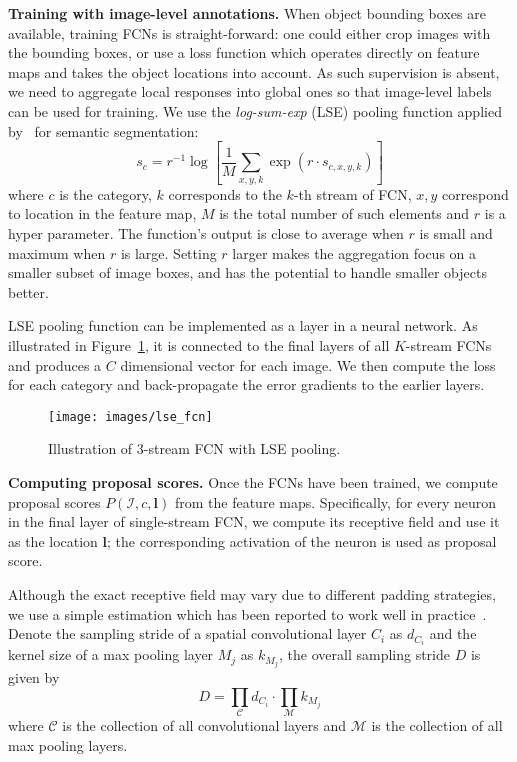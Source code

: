 \documentclass[10pt,twocolumn,letterpaper]{article}
\begin{document}
\textbf{Training with image-level annotations.} When object bounding boxes are available, training FCNs is straight-forward: one could either crop images with the bounding boxes, or use a loss function which operates directly on feature maps and takes the object locations into account. As such supervision is absent, we need to aggregate local responses into global ones so that image-level labels can be used for training. We use the \textit{log-sum-exp} (LSE) pooling function applied by~\cite{pinheiro:2015a} for semantic segmentation:
\begin{equation}
s_{c} = r^{-1}\log\left[\frac{1}{M}\sum_{x,y,k}\exp(r\cdot s_{c,x,y,k})\right]
\end{equation}
where $c$ is the category, $k$ corresponds to the $k$-th stream of FCN, $x,y$ correspond to location in the feature map, $M$ is the total number of such elements and $r$ is a hyper parameter. The function's output is close to average when $r$ is small and maximum when $r$ is large. Setting $r$ larger makes the aggregation focus on a smaller subset of image boxes, and has the potential to handle smaller objects better.

LSE pooling function can be implemented as a layer in a neural network. As illustrated in Figure~\ref{fig:lse}, it is connected to the final layers of all $K$-stream FCNs and produces a $C$ dimensional vector for each image. We then compute the loss for each category and back-propagate the error gradients to the earlier layers.

\begin{figure}
  \centering
    \texttt{[image: images/lse\_fcn]}
  \caption{Illustration of 3-stream FCN with LSE pooling.}
  \label{fig:lse}
\end{figure}


\textbf{Computing proposal scores.} Once the FCNs have been trained, we compute proposal scores $P(\mathcal{I}, c, \mathbf{l})$ from the feature maps. Specifically, for every neuron in the final layer of single-stream FCN, we compute its receptive field and use it as the location $\mathbf{l}$; the corresponding activation of the neuron is used as proposal score. 

Although the exact receptive field may vary due to different padding strategies, we use a simple estimation which has been reported to work well in practice~\cite{DBLP:journals/corr/SermanetEZMFL13}. Denote the sampling stride of a spatial convolutional layer $C_i$ as $d_{C_i}$ and the kernel size of a max pooling layer $M_j$ as $k_{M_j}$, the overall sampling stride $D$ is given by
\begin{equation}
D = \prod_{\mathcal{C}} d_{C_i} \cdot \prod_{\mathcal{M}} k_{M_j}
\end{equation}
where $\mathcal{C}$ is the collection of all convolutional layers and $\mathcal{M}$ is the collection of all max pooling layers.
\end{document}

